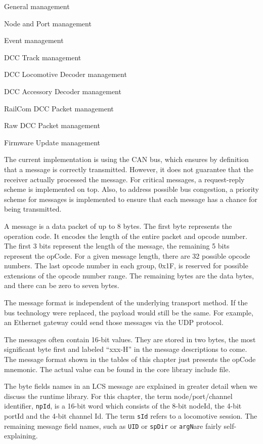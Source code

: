 \begin{smallGapItemize}
    \item General management
    \item Node and Port management
    \item Event management
    \item DCC Track management
    \item DCC Locomotive Decoder management
    \item DCC Accessory Decoder management
    \item RailCom DCC Packet management
    \item Raw DCC Packet management
    \item Firmware Update management
\end{smallGapItemize}

The current implementation is using the CAN bus, which ensures by definition that a message is correctly transmitted. However, it does not guarantee that the receiver actually processed the message. For critical messages, a request-reply scheme is implemented on top. Also, to address possible bus congestion, a priority scheme for messages is implemented to ensure that each message has a chance for being transmitted.

A message is a data packet of up to 8 bytes. The first byte represents the operation code. It encodes the length of the entire packet and opcode number. The first 3 bits represent the length of the message, the remaining 5 bits represent the opCode. For a given message length, there are 32 possible opcode numbers. The last opcode number in each group, 0x1F, is reserved for possible extensions of the opcode number range. The remaining bytes are the data bytes, and there can be zero to seven bytes. 

The message format is independent of the underlying transport method. If the bus technology were replaced, the payload would still be the same. For example, an Ethernet gateway could send those messages via the UDP protocol. 

The messages often contain 16-bit values. They are stored in two bytes, the most significant byte first and labeled ``xxx-H'' in the message descriptions to come. The message format shown in the tables of this chapter just presents the opCode mnemonic. The actual value can be found in the core library include file.

The byte fields names in an LCS message are explained in greater detail when we discuss the runtime library. For this chapter, the term node/port/channel identifier, \texttt{npId}, is a 16-bit word which consists of the 8-bit nodeId, the 4-bit portId and the 4-bit channel Id. The term \texttt{sId} refers to a locomotive session. The remaining message field names, such as \texttt{UID} or \texttt{spDir} or \texttt{argN}are fairly self-explaining.

